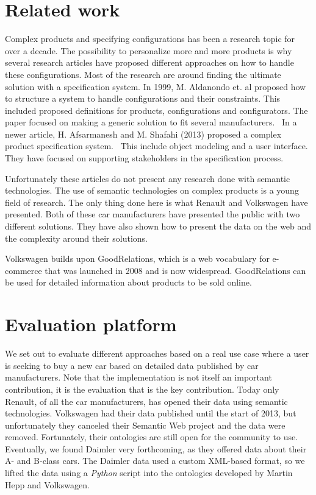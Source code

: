 \documentclass{llncs}
\begin{document}
\section{Related work}
Complex products and specifying configurations has been a research
topic for over a decade.  The possibility to personalize more and more
products is why several research articles have proposed different
approaches on how to handle these configurations. Most of the research
are around finding the ultimate solution with a specification
system. In 1999, M. Aldanondo et. al proposed how to structure a
system to handle configurations and their constraints. This included
proposed definitions for products, configurations and
configurators. The paper focused on making a generic solution to fit
several manufacturers.~\cite{OldConf} In a newer article,
H. Afsarmanesh and M. Shafahi (2013) proposed a complex product
specification system.~\cite{NewConf} This include object modeling and
a user interface. They have focused on supporting stakeholders in the
specification process.

Unfortunately these articles do not present any research done with
semantic technologies. The use of semantic technologies on complex
products is a young field of research. The only thing done here is
what Renault and Volkswagen have presented. Both of these car
manufacturers have presented the public with two different
solutions. They have also shown how to present the data on the web and
the complexity around their solutions.

Volkswagen builds upon GoodRelations\cite{GRQual}, which
is a web vocabulary for e-commerce that was launched in 2008 and is now
widespread.  GoodRelations can be used for detailed information about
products to be sold online.


\section{Evaluation platform}

We set out to evaluate different approaches based on a real use case
where a user is seeking to buy a new car based on detailed data
published by car manufacturers. Note that the implementation is not
itself an important contribution, it is the evaluation that is the key
contribution. Today only Renault, of all the car manufacturers, has
opened their data using semantic technologies. Volkswagen had their
data published until the start of 2013, but unfortunately they
canceled their Semantic Web project and the data were removed.
Fortunately, their ontologies are still open for the community to
use. Eventually, we found Daimler very forthcoming, as they offered
data about their A- and B-class cars.  The Daimler data used a custom
XML-based format, so we lifted the data using a \textit{Python} script into the
ontologies developed by Martin Hepp and Volkswagen.
\end{document}
